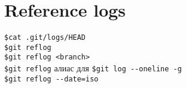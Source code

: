 \section{Reference logs}

\texttt{\$cat .git/logs/HEAD} \\
\texttt{\$git reflog} \\
\texttt{\$git reflog <branch>} \\
\texttt{\$git reflog} \indent  алиас для \indent \texttt{\$git log {-}-oneline -g} \\
\texttt{\$git reflog {-}-date=iso} \\
